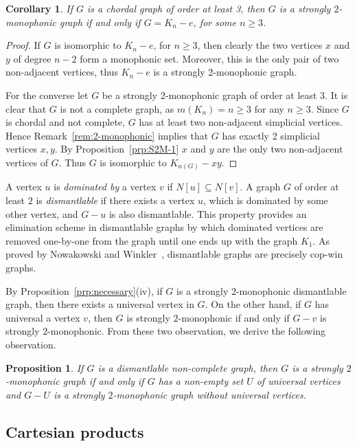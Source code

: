 \documentclass[a4paper,11pt]{article}
\newtheorem{corollary}[theorem]{Corollary}
\newtheorem{proposition}[theorem]{Proposition}
\begin{document}
\begin{corollary}\label{c:S2Mchordal}
If $G$ is a chordal graph of order at least 3, then $G$ is a strongly $2$-monophonic graph if and only if $G=K_n-e$, for some $n\ge 3$.    
\end{corollary}
\begin{proof}
    If $G$ is isomorphic to $K_n-e$, for $n\geq 3$, then clearly the two vertices $x$ and $y$ of degree $n-2$ form a monophonic set. Moreover, this is the only pair of two non-adjacent vertices, thus $K_n-e$ is a strongly 2-monophonic graph.

    For the converse let $G$ be a strongly 2-monophonic graph of order at least 3. It is clear that $G$ is not a complete graph, as $m(K_n)=n\geq 3$ for any $n \geq 3$. Since $G$ is chordal and not complete, $G$ has at least two non-adjacent simplicial vertices. Hence Remark~\ref{rem:2-monophonic} implies that $G$ has exactly 2 simplicial vertices $x,y$. By Proposition~\ref{prp:S2M-1} $x$ and $y$ are the only two non-adjacent vertices of $G$. Thus $G$ is isomorphic to $K_{n(G)}-xy$.
\end{proof}

A vertex $u$ is {\em dominated by} a vertex $v$ if $N[u]\subseteq N[v]$.
A graph $G$ of order at least $2$ is {\em dismantlable} if there exists a vertex $u$, which is dominated by some other vertex, and $G-u$ is also dismantlable. This property provides an elimination scheme in dismantlable graphs by which dominated vertices are removed one-by-one from the graph until one ends up with the graph $K_1$. As proved by Nowakowski and Winkler~\cite{NR}, dismantlable graphs are precisely cop-win graphs. 

By Proposition~\ref{prp:necessary}(iv), if $G$ is a strongly $2$-monophonic dismantlable graph, then there exists a universal vertex in $G$. 
On the other hand, if $G$ has universal a vertex $v$, then $G$ is strongly $2$-monophonic if and only if $G-v$ is strongly $2$-monophonic. From these two observation, we derive the following observation.
\begin{proposition}
\label{prp:dismant}
If $G$ is a dismantlable non-complete graph, then $G$ is a strongly $2$-monophonic graph if and only if $G$ has a non-empty set $U$ of universal vertices and $G-U$ is a strongly $2$-monophonic graph without universal vertices.    
\end{proposition}

\subsection{Cartesian products}
\end{document}
